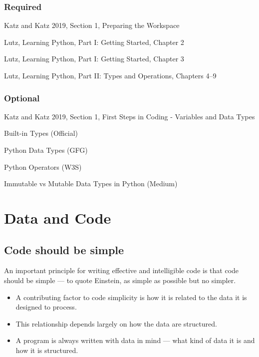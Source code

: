 \documentclass[
  letterpaper,
  DIV=11,
  numbers=noendperiod]{scrreprt}
\providecommand{\tightlist}{%
  \setlength{\itemsep}{0pt}\setlength{\parskip}{0pt}}\usepackage{longtable,booktabs,array}
\begin{document}
\hypertarget{required}{%
\subsection*{Required}\label{required}}

Katz and Katz 2019, Section 1, Preparing the Workspace

Lutz, Learning Python, Part I: Getting Started, Chapter 2

Lutz, Learning Python, Part I: Getting Started, Chapter 3

Lutz, Learning Python, Part II: Types and Operations, Chapters 4--9

\hypertarget{optional}{%
\subsection*{Optional}\label{optional}}

Katz and Katz 2019, Section 1, First Steps in Coding - Variables and
Data Types

Built-in Types (Official)

Python Data Types (GFG)

Python Operators (W3S)

Immutable vs Mutable Data Types in Python (Medium)

\hypertarget{data-and-code}{%
\chapter{Data and Code}\label{data-and-code}}

\hypertarget{code-should-be-simple}{%
\section{Code should be simple}\label{code-should-be-simple}}

An important principle for writing effective and intelligible code is
that code should be simple --- to quote Einstein, as simple as possible
but no simpler.

\begin{itemize}
\tightlist
\item
  A contributing factor to code simplicity is how it is related to the
  data it is designed to process.
\item
  This relationship depends largely on how the data are structured.
\item
  A program is always written with data in mind --- what kind of data it
  is and how it is structured.
\end{itemize}
\end{document}
